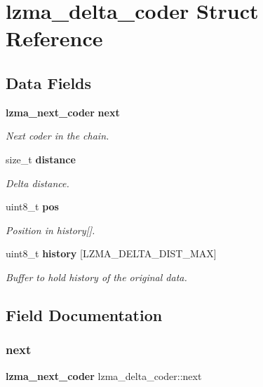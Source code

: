 \section{lzma\+\_\+delta\+\_\+coder Struct Reference}
\label{structlzma__delta__coder}
\subsection*{Data Fields}
\begin{DoxyCompactItemize}
\item 
\textbf{ lzma\+\_\+next\+\_\+coder} \textbf{ next}
\begin{DoxyCompactList}\small\item\em Next coder in the chain. \end{DoxyCompactList}\item 
size\+\_\+t \textbf{ distance}
\begin{DoxyCompactList}\small\item\em Delta distance. \end{DoxyCompactList}\item 
uint8\+\_\+t \textbf{ pos}
\begin{DoxyCompactList}\small\item\em Position in history[]. \end{DoxyCompactList}\item 
uint8\+\_\+t \textbf{ history} [L\+Z\+M\+A\+\_\+\+D\+E\+L\+T\+A\+\_\+\+D\+I\+S\+T\+\_\+\+M\+AX]
\begin{DoxyCompactList}\small\item\em Buffer to hold history of the original data. \end{DoxyCompactList}\end{DoxyCompactItemize}


\subsection{Field Documentation}
\mbox{\label{structlzma__delta__coder_a251d2b3771a7556f8b04b745461a81af}} 
\subsubsection{next}
{\footnotesize\ttfamily \textbf{ lzma\+\_\+next\+\_\+coder} lzma\+\_\+delta\+\_\+coder\+::next}



